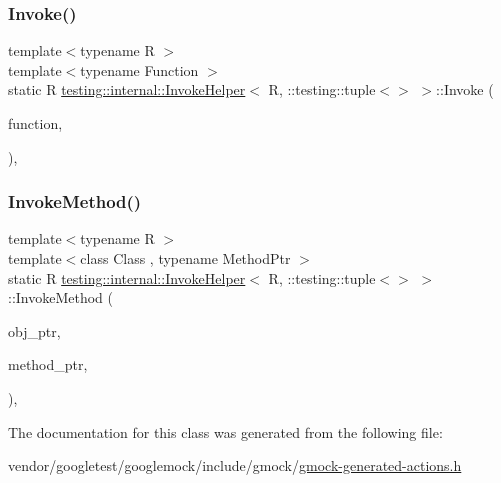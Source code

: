 \subsubsection{\texorpdfstring{Invoke()}{Invoke()}}
{\footnotesize\ttfamily template$<$typename R $>$ \\
template$<$typename Function $>$ \\
static R \hyperlink{classtesting_1_1internal_1_1_invoke_helper}{testing\+::internal\+::\+Invoke\+Helper}$<$ R, \+::testing\+::tuple$<$$>$ $>$\+::Invoke (\begin{DoxyParamCaption}\item[{\hyperlink{structtesting_1_1internal_1_1_function}{Function}}]{function,  }\item[{const \+::testing\+::tuple$<$$>$ \&}]{ }\end{DoxyParamCaption})\hspace{0.3cm}{\ttfamily [inline]}, {\ttfamily [static]}}

\mbox{\label{classtesting_1_1internal_1_1_invoke_helper_3_01_r_00_01_1_1testing_1_1tuple_3_4_01_4_a0368e26cbc1bcb12abbfb802f8294fa0}} 
\subsubsection{\texorpdfstring{Invoke\+Method()}{InvokeMethod()}}
{\footnotesize\ttfamily template$<$typename R $>$ \\
template$<$class Class , typename Method\+Ptr $>$ \\
static R \hyperlink{classtesting_1_1internal_1_1_invoke_helper}{testing\+::internal\+::\+Invoke\+Helper}$<$ R, \+::testing\+::tuple$<$$>$ $>$\+::Invoke\+Method (\begin{DoxyParamCaption}\item[{Class $\ast$}]{obj\+\_\+ptr,  }\item[{Method\+Ptr}]{method\+\_\+ptr,  }\item[{const \+::testing\+::tuple$<$$>$ \&}]{ }\end{DoxyParamCaption})\hspace{0.3cm}{\ttfamily [inline]}, {\ttfamily [static]}}



The documentation for this class was generated from the following file\+:\begin{DoxyCompactItemize}
\item 
vendor/googletest/googlemock/include/gmock/\hyperlink{gmock-generated-actions_8h}{gmock-\/generated-\/actions.\+h}\end{DoxyCompactItemize}
